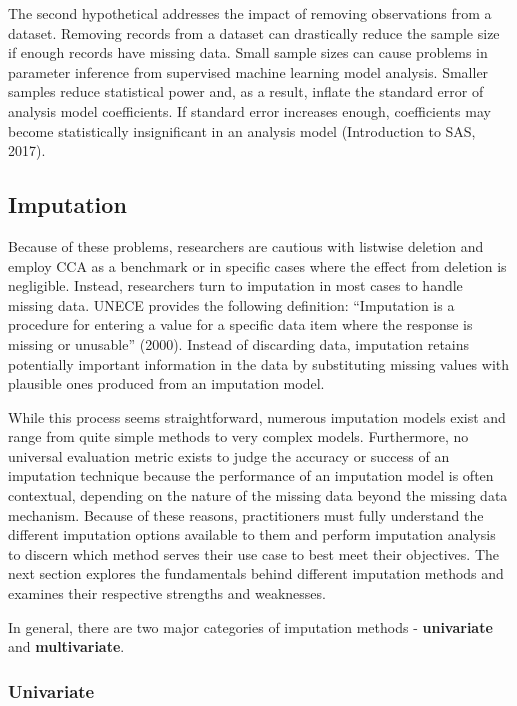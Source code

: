 \documentclass[12pt,oneside]{chicagocapstone}
\begin{document}
The second hypothetical addresses the impact of removing observations
from a dataset. Removing records from a dataset can drastically reduce
the sample size if enough records have missing data. Small sample sizes
can cause problems in parameter inference from supervised machine
learning model analysis. Smaller samples reduce statistical power and,
as a result, inflate the standard error of analysis model coefficients.
If standard error increases enough, coefficients may become
statistically insignificant in an analysis model (Introduction to SAS,
2017).

\subsection*{Imputation}\label{background-imputation}

Because of these problems, researchers are cautious with listwise
deletion and employ CCA as a benchmark or in specific cases where the
effect from deletion is negligible. Instead, researchers turn to
imputation in most cases to handle missing data. UNECE provides the
following definition: ``Imputation is a procedure for entering a value
for a specific data item where the response is missing or unusable''
(2000). Instead of discarding data, imputation retains potentially
important information in the data by substituting missing values with
plausible ones produced from an imputation model.

While this process seems straightforward, numerous imputation models
exist and range from quite simple methods to very complex models.
Furthermore, no universal evaluation metric exists to judge the accuracy
or success of an imputation technique because the performance of an
imputation model is often contextual, depending on the nature of the
missing data beyond the missing data mechanism. Because of these
reasons, practitioners must fully understand the different imputation
options available to them and perform imputation analysis to discern
which method serves their use case to best meet their objectives. The
next section explores the fundamentals behind different imputation
methods and examines their respective strengths and weaknesses.

In general, there are two major categories of imputation methods -
\textbf{univariate} and \textbf{multivariate}.

\subsubsection*{Univariate}\label{univariate}
\end{document}
